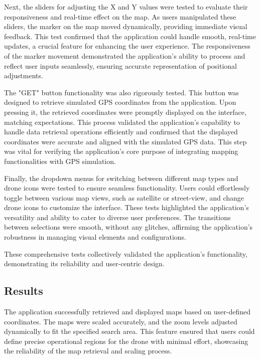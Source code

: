 \documentclass[conference]{IEEEtran}
\begin{document}
Next, the sliders for adjusting the X and Y values were tested to evaluate their responsiveness and real-time effect on the map. As users manipulated these sliders, the marker on the map moved dynamically, providing immediate visual feedback. This test confirmed that the application could handle smooth, real-time updates, a crucial feature for enhancing the user experience. The responsiveness of the marker movement demonstrated the application's ability to process and reflect user inputs seamlessly, ensuring accurate representation of positional adjustments.

The "GET" button functionality was also rigorously tested. This button was designed to retrieve simulated GPS coordinates from the application. Upon pressing it, the retrieved coordinates were promptly displayed on the interface, matching expectations. This process validated the application's capability to handle data retrieval operations efficiently and confirmed that the displayed coordinates were accurate and aligned with the simulated GPS data. This step was vital for verifying the application's core purpose of integrating mapping functionalities with GPS simulation.

Finally, the dropdown menus for switching between different map types and drone icons were tested to ensure seamless functionality. Users could effortlessly toggle between various map views, such as satellite or street-view, and change drone icons to customize the interface. These tests highlighted the application's versatility and ability to cater to diverse user preferences. The transitions between selections were smooth, without any glitches, affirming the application's robustness in managing visual elements and configurations.

These comprehensive tests collectively validated the application's functionality, demonstrating its reliability and user-centric design.


\subsection{Results}


The application successfully retrieved and displayed maps based on user-defined coordinates. The maps were scaled accurately, and the zoom levels adjusted dynamically to fit the specified search area. This feature ensured that users could define precise operational regions for the drone with minimal effort, showcasing the reliability of the map retrieval and scaling process.
\end{document}

